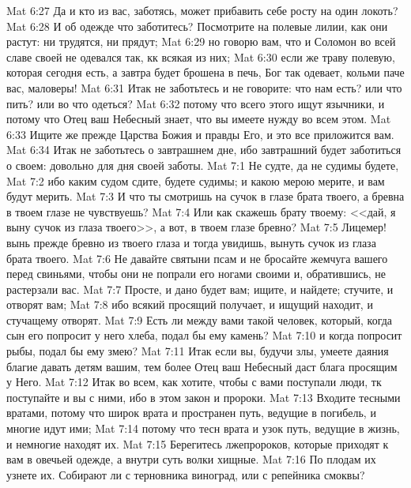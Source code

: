 \vs Mat 6:27 Да и кто из вас, заботясь, может прибавить себе росту  на один локоть?
\vs Mat 6:28 И об одежде что заботитесь? Посмотрите на полевые лилии, как они растут: ни трудятся, ни прядут;
\vs Mat 6:29 но говорю вам, что и Соломон во всей славе своей не одевался так, кк всякая из них;
\vs Mat 6:30 если же траву полевую, которая сегодня есть, а завтра будет брошена в печь, Бог так одевает, кольми паче вас, маловеры!
\vs Mat 6:31 Итак не заботьтесь и не говорите: что нам есть? или что пить? или во что одеться?
\vs Mat 6:32 потому что всего этого ищут язычники, и потому что Отец ваш Небесный знает, что вы имеете нужду во всем этом.
\vs Mat 6:33 Ищите же прежде Царства Божия и правды Его, и это все приложится вам.
\vs Mat 6:34 Итак не заботьтесь о завтрашнем дне, ибо завтрашний  будет заботиться о своем: довольно для  дня своей заботы.
\vs Mat 7:1 Не судте, да не судимы будете,
\vs Mat 7:2 ибо каким судом сдите,  будете судимы; и какою мерою мерите,  и вам будут мерить.
\vs Mat 7:3 И что ты смотришь на сучок в глазе брата твоего, а бревна в твоем глазе не чувствуешь?
\vs Mat 7:4 Или как скажешь брату твоему: <<дай, я выну сучок из глаза твоего>>, а вот, в твоем глазе бревно?
\vs Mat 7:5 Лицемер! вынь прежде бревно из твоего глаза и тогда увидишь,  вынуть сучок из глаза брата твоего.
\rsbpar\vs Mat 7:6 Не давайте святыни псам и не бросайте жемчуга вашего перед свиньями, чтобы они не попрали его ногами своими и, обратившись, не растерзали вас.
\rsbpar\vs Mat 7:7 Просте, и дано будет вам; ищите, и найдете; стучите, и отворят вам;
\vs Mat 7:8 ибо всякий просящий получает, и ищущий находит, и стучащему отворят.
\vs Mat 7:9 Есть ли между вами такой человек, который, когда сын его попросит у него хлеба, подал бы ему камень?
\vs Mat 7:10 и когда попросит рыбы, подал бы ему змею?
\vs Mat 7:11 Итак если вы, будучи злы, умеете даяния благие давать детям вашим, тем более Отец ваш Небесный даст блага просящим у Него.
\rsbpar\vs Mat 7:12 Итак во всем, как хотите, чтобы с вами поступали люди, тк поступайте и вы с ними, ибо в этом закон и пророки.
\rsbpar\vs Mat 7:13 Входите тесными вратами, потому что широк врата и пространен путь, ведущие в погибель, и многие идут ими;
\vs Mat 7:14 потому что тесн врата и узок путь, ведущие в жизнь, и немногие находят их.
\rsbpar\vs Mat 7:15 Берегитесь лжепророков, которые приходят к вам в овечьей одежде, а внутри суть волки хищные.
\vs Mat 7:16 По плодам их узнете их. Собирают ли с терновника виноград, или с репейника смоквы?
